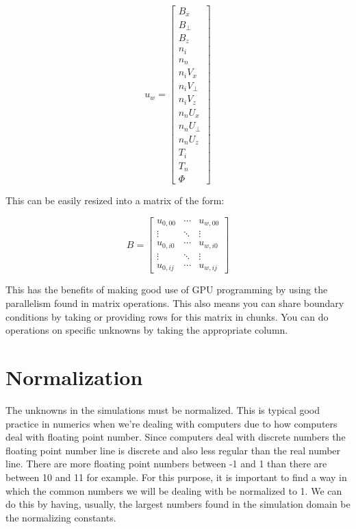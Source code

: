 \documentclass[12pt,upcase]{umlthesis}
\begin{document}
\begin{equation}
	u_w = 
	\begin{bmatrix}
		B_x \\
		B_{\perp} \\
		B_z \\
		n_i \\
		n_n \\
		n_i V_x \\
		n_i V_{\perp} \\
		n_i V_z \\
		n_n U_x \\
		n_n U_{\perp} \\
		n_n U_z \\
		T_i \\
		T_n \\
		\Phi
	\end{bmatrix}
\end{equation}

This can be easily resized into a matrix of the form:

\begin{equation}
	B =
	\begin{bmatrix}
		u_{0,00} & \cdots  & u_{w,00} \\
		\vdots   & \ddots & \vdots \\
		u_{0,i0} & \cdots & u_{w,i0} \\
		\vdots   & \ddots & \vdots \\
		u_{0,ij} & \cdots  & u_{w,ij}
	\end{bmatrix}
\end{equation}

This has the benefits of making good use of GPU programming by using the parallelism found in matrix operations. This also means you can share boundary conditions by taking or providing rows for this matrix in chunks. You can do operations on specific unknowns by taking the appropriate column.

\section{Normalization}\label{sec:normalization}

The unknowns in the simulations must be normalized. This is typical good practice in numerics when we're dealing with computers due to how computers deal with floating point number. Since computers deal with discrete numbers the floating point number line is discrete and also less regular than the real number line. There are more floating point numbers between -1 and 1 than there are between 10 and 11 for example. For this purpose, it is important to find a way in which the common numbers we will be dealing with be normalized to 1. We can do this by having, usually, the largest numbers found in the simulation domain be the normalizing constants.
\end{document}
